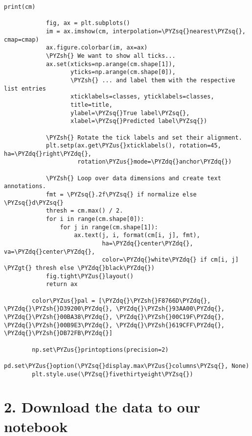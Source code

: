 \documentclass[11pt]{article}
\def\PYZsq{\textquotesingle}%
\def\PYZus{\char`\_}
\def\PYZgt{\char`\>}
\def\PYZsh{\char`\#}
\def\PYZsq{\char`\'}
\def\PYZdq{\char`\"}
\begin{document}
\begin{Verbatim}[commandchars=\\\{\}]
            print(cm)
        
            fig, ax = plt.subplots()
            im = ax.imshow(cm, interpolation=\PYZsq{}nearest\PYZsq{}, cmap=cmap)
            ax.figure.colorbar(im, ax=ax)
            \PYZsh{} We want to show all ticks...
            ax.set(xticks=np.arange(cm.shape[1]),
                   yticks=np.arange(cm.shape[0]),
                   \PYZsh{} ... and label them with the respective list entries
                   xticklabels=classes, yticklabels=classes,
                   title=title,
                   ylabel=\PYZsq{}True label\PYZsq{},
                   xlabel=\PYZsq{}Predicted label\PYZsq{})
        
            \PYZsh{} Rotate the tick labels and set their alignment.
            plt.setp(ax.get\PYZus{}xticklabels(), rotation=45, ha=\PYZdq{}right\PYZdq{},
                     rotation\PYZus{}mode=\PYZdq{}anchor\PYZdq{})
        
            \PYZsh{} Loop over data dimensions and create text annotations.
            fmt = \PYZsq{}.2f\PYZsq{} if normalize else \PYZsq{}d\PYZsq{}
            thresh = cm.max() / 2.
            for i in range(cm.shape[0]):
                for j in range(cm.shape[1]):
                    ax.text(j, i, format(cm[i, j], fmt),
                            ha=\PYZdq{}center\PYZdq{}, va=\PYZdq{}center\PYZdq{},
                            color=\PYZdq{}white\PYZdq{} if cm[i, j] \PYZgt{} thresh else \PYZdq{}black\PYZdq{})
            fig.tight\PYZus{}layout()
            return ax
        
        color\PYZus{}pal = [\PYZdq{}\PYZsh{}F8766D\PYZdq{}, \PYZdq{}\PYZsh{}D39200\PYZdq{}, \PYZdq{}\PYZsh{}93AA00\PYZdq{}, \PYZdq{}\PYZsh{}00BA38\PYZdq{}, \PYZdq{}\PYZsh{}00C19F\PYZdq{}, \PYZdq{}\PYZsh{}00B9E3\PYZdq{}, \PYZdq{}\PYZsh{}619CFF\PYZdq{}, \PYZdq{}\PYZsh{}DB72FB\PYZdq{}]
        
        np.set\PYZus{}printoptions(precision=2)
        pd.set\PYZus{}option(\PYZsq{}display.max\PYZus{}columns\PYZsq{}, None)
        plt.style.use(\PYZsq{}fivethirtyeight\PYZsq{})
\end{Verbatim}


    \section{2. Download the data to our notebook
}\label{download-the-data-to-our-notebook}
\end{document}
